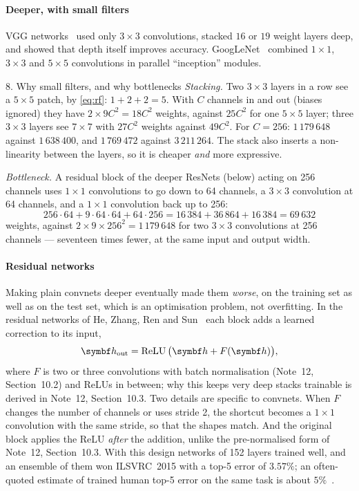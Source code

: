 \documentclass[11pt]{article}
\newcommand{\ReLU}{\operatorname{ReLU}}
\begin{document}
\paragraph{Deeper, with small filters} VGG networks~\cite{simonyan2015} used only $3 \times 3$ convolutions, stacked
$16$ or $19$ weight layers deep, and showed that depth itself improves accuracy. GoogLeNet~\cite{szegedy2015} combined $1 \times 1$, $3 \times 3$ and
$5 \times 5$ convolutions in parallel ``inception'' modules.

\begin{worked}{8. Why small filters, and why bottlenecks}
\emph{Stacking.} Two $3 \times 3$ layers in a row see a $5 \times 5$ patch, by \eqref{eq:rf}: $1 + 2 + 2 = 5$. With $C$
channels in and out (biases ignored) they have $2 \times 9C^2 = 18C^2$ weights, against $25C^2$ for one $5 \times 5$ layer;
three $3 \times 3$ layers see $7 \times 7$ with $27C^2$ weights against $49C^2$. For $C = 256$: $1\,179\,648$ against
$1\,638\,400$, and $1\,769\,472$ against $3\,211\,264$. The stack also inserts a non-linearity between the layers, so it is
cheaper \emph{and} more expressive.

\emph{Bottleneck.} A residual block of the deeper ResNets (below) acting on 256 channels uses $1 \times 1$ convolutions to go
down to 64 channels, a $3 \times 3$ convolution at 64 channels, and a $1 \times 1$ convolution back up to 256:
\[
  256 \cdot 64 + 9 \cdot 64 \cdot 64 + 64 \cdot 256 = 16\,384 + 36\,864 + 16\,384 = 69\,632
\]
weights, against $2 \times 9 \times 256^2 = 1\,179\,648$ for two $3 \times 3$ convolutions at 256 channels --- seventeen times
fewer, at the same input and output width.
\end{worked}

\paragraph{Residual networks} Making plain convnets deeper eventually made them \emph{worse}, on the training set as well
as on the test set, which is an optimisation problem, not overfitting. In the residual networks of He, Zhang, Ren and
Sun~\cite{he2016} each block adds a learned correction to its input,
\begin{equation}\label{eq:resblock}
  \vect{h}_{\mathrm{out}} = \ReLU\big(\vect{h} + F(\vect{h})\big),
\end{equation}
where $F$ is two or three convolutions with batch normalisation (Note~12, Section~10.2) and ReLUs in between; why this
keeps very deep stacks trainable is derived in Note~12, Section~10.3. Two details are specific to convnets. When $F$
changes the number of channels or uses stride 2, the shortcut becomes a $1 \times 1$ convolution with the same stride, so
that the shapes match. And the original block applies the ReLU \emph{after} the addition, unlike the pre-normalised
form of Note~12, Section~10.3. With this design networks of 152 layers trained well, and an ensemble of them won ILSVRC~2015 with a
top-5 error of $3.57\%$; an often-quoted estimate of trained human top-5 error on the same task is about
$5\%$~\cite{russakovsky2015}.
\end{document}
